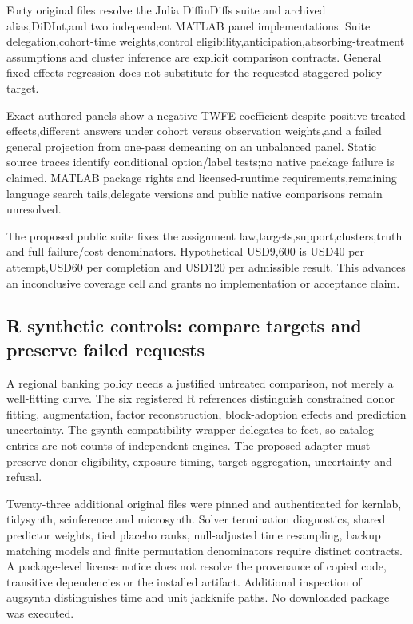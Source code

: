 Forty original files resolve the Julia DiffinDiffs suite and archived
alias,DiDInt,and two independent MATLAB panel implementations. Suite
delegation,cohort-time weights,control
eligibility,anticipation,absorbing-treatment assumptions and cluster
inference are explicit comparison contracts. General fixed-effects
regression does not substitute for the requested staggered-policy
target.\citep{exec25_panelother_julia,exec25_panelother_didint,exec25_panelother_matlab,exec25_panelother_choice}

Exact authored panels show a negative TWFE coefficient despite positive
treated effects,different answers under cohort versus observation
weights,and a failed general projection from one-pass demeaning on an
unbalanced panel. Static source traces identify conditional option/label
tests;no native package failure is claimed. MATLAB package rights and
licensed-runtime requirements,remaining language search tails,delegate
versions and public native comparisons remain
unresolved.\citep{exec25_panelother_choice}

The proposed public suite fixes the assignment
law,targets,support,clusters,truth and full failure/cost denominators.
Hypothetical USD9,600 is USD40 per attempt,USD60 per completion and
USD120 per admissible result. This advances an inconclusive coverage
cell and grants no implementation or acceptance
claim.\citep{exec25_panelother_choice}

\hypertarget{r-synthetic-controls-compare-targets-and-preserve-failed-requests}{%
\subsection{R synthetic controls: compare targets and preserve failed
requests}\label{r-synthetic-controls-compare-targets-and-preserve-failed-requests}}

A regional banking policy needs a justified untreated comparison, not
merely a well-fitting curve. The six registered R references distinguish
constrained donor fitting, augmentation, factor reconstruction,
block-adoption effects and prediction uncertainty. The gsynth
compatibility wrapper delegates to fect, so catalog entries are not
counts of independent engines. The proposed adapter must preserve donor
eligibility, exposure timing, target aggregation, uncertainty and
refusal.
\citep{exec24_synth_source,exec24_augsynth_source,exec24_scpi_source,exec24_fect_source,exec21_gsynth_wrapper,exec23_synthdid_reuse_source}

Twenty-three additional original files were pinned and authenticated for
kernlab, tidysynth, scinference and microsynth. Solver termination
diagnostics, shared predictor weights, tied placebo ranks, null-adjusted
time resampling, backup matching models and finite permutation
denominators require distinct contracts. A package-level license notice
does not resolve the provenance of copied code, transitive dependencies
or the installed artifact. Additional inspection of augsynth
distinguishes time and unit jackknife paths. No downloaded package was
executed.
\citep{exec25_synthr_kernlab,exec25_synthr_tidysynth,exec25_synthr_scinference,exec25_synthr_microsynth,exec25_synthr_auginference}

